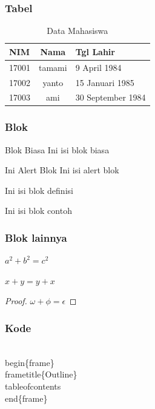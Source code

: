 \documentclass[handout]{beamer}
\begin{document}

\begin{frame}
\frametitle{Tabel}
\begin{table}
	\begin{tabular}{l | c | l }
		NIM & Nama & Tgl Lahir \\
		\hline \hline
		17001 & tamami & 9 April 1984 \\
		17002 & yanto & 15 Januari 1985 \\
		17003 & ami & 30 September 1984 
	\end{tabular}
	\caption{Data Mahasiswa}
\end{table}
\end{frame}



\begin{frame}
\frametitle{Blok}
\begin{block}{Blok Biasa}
Ini isi blok biasa
\end{block}

\begin{alertblock}{Ini Alert Blok}
Ini isi alert blok
\end{alertblock}

\begin{definition}
Ini isi blok definisi
\end{definition}

\begin{example}
Ini isi blok contoh
\end{example}
\end{frame}



\begin{frame}
\frametitle{Blok lainnya}
\begin{theorem}[Pythagoras]
$ a^2 + b^2 = c^2 $
\end{theorem}

\begin{corollary}
$ x + y = y + x $
\end{corollary}

\begin{proof}
$ \omega + \phi = \epsilon $
\end{proof}
\end{frame}



\begin{frame}[fragile]
\frametitle{Kode}
\begin{semiverbatim}
	\\begin\{frame\}
	\\frametitle\{Outline\}
	\\tableofcontents
	\\end\{frame\}
\end{semiverbatim}
\end{frame}
\end{document}
